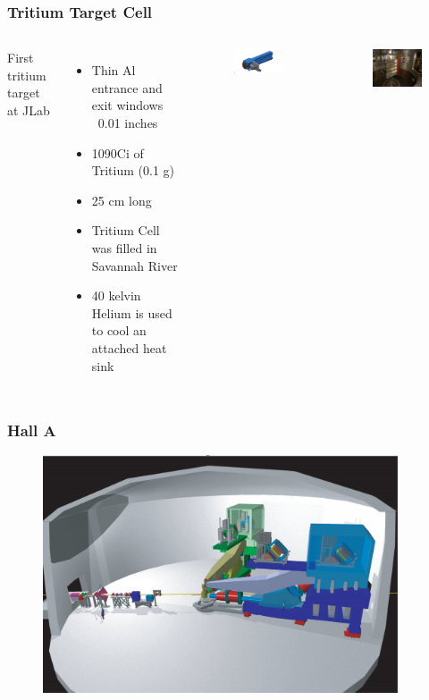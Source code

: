 \documentclass[12pt]{beamer}
\begin{document}
\begin{frame}
\frametitle{Tritium Target Cell}
\begin{columns}[]
	First tritium target at JLab
	\begin{itemize}
		\item Thin Al entrance and exit windows ~0.01 inches
		\item 1090Ci of Tritium (0.1 g)
		\item 25 cm long
		\item Tritium Cell was filled in Savannah River
		\item 40 kelvin Helium is used to cool an attached heat sink
	\end{itemize}
	\begin{figure}
		\includegraphics[width=5cm]{../images/tgt_cell}
	\end{figure}
	\vspace{-10pt}
	\begin{figure}
		\includegraphics[width=5cm]{../images/tag_lat}
	\end{figure}
\end{columns}
\end{frame}


\begin{frame}
\frametitle{Hall A}
\begin{figure}
	\includegraphics[width=10.5cm]{../images/halla.pdf}
\end{figure}
\end{frame}
\end{document}
